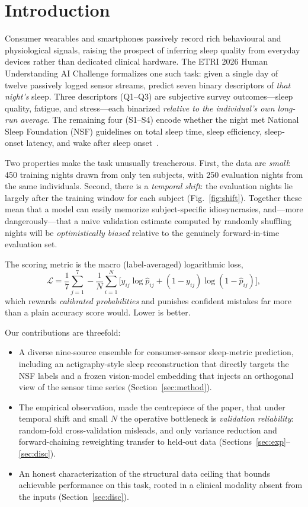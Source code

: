 \documentclass[conference]{IEEEtran}
\begin{document}
\section{Introduction}
Consumer wearables and smartphones passively record rich behavioural and
physiological signals, raising the prospect of inferring sleep quality from everyday
devices rather than dedicated clinical hardware. The ETRI 2026 Human Understanding AI
Challenge formalizes one such task: given a single day of twelve passively logged
sensor streams, predict seven binary descriptors of \emph{that night's} sleep. Three
descriptors (Q1--Q3) are subjective survey outcomes---sleep quality, fatigue, and
stress---each binarized \emph{relative to the individual's own long-run average}. The
remaining four (S1--S4) encode whether the night met National Sleep Foundation (NSF)
guidelines on total sleep time, sleep efficiency, sleep-onset latency, and wake after
sleep onset~\cite{nsf}.

Two properties make the task unusually treacherous. First, the data are
\emph{small}: 450 training nights drawn from only ten subjects, with 250 evaluation
nights from the same individuals. Second, there is a \emph{temporal shift}: the
evaluation nights lie largely after the training window for each subject
(Fig.~\ref{fig:shift}). Together these mean that a model can easily memorize
subject-specific idiosyncrasies, and---more dangerously---that a naive validation
estimate computed by randomly shuffling nights will be \emph{optimistically biased}
relative to the genuinely forward-in-time evaluation set.

The scoring metric is the macro (label-averaged) logarithmic loss,
\begin{equation}
\mathcal{L} = \frac{1}{7}\sum_{j=1}^{7}
-\frac{1}{N}\sum_{i=1}^{N}\Big[y_{ij}\log \hat p_{ij}+(1-y_{ij})\log(1-\hat p_{ij})\Big],
\label{eq:logloss}
\end{equation}
which rewards \emph{calibrated probabilities} and punishes confident mistakes far
more than a plain accuracy score would. Lower is better.

Our contributions are threefold:
\begin{itemize}
\item A diverse nine-source ensemble for consumer-sensor sleep-metric prediction,
including an actigraphy-style sleep reconstruction that directly targets the
NSF labels and a frozen vision-model embedding that injects an orthogonal view of
the sensor time series (Section~\ref{sec:method}).
\item The empirical observation, made the centrepiece of the paper, that under
temporal shift and small $N$ the operative bottleneck is \emph{validation
reliability}: random-fold cross-validation misleads, and only variance reduction
and forward-chaining reweighting transfer to held-out data
(Sections~\ref{sec:exp}--\ref{sec:disc}).
\item An honest characterization of the structural data ceiling that bounds achievable
performance on this task, rooted in a clinical modality absent from the inputs
(Section~\ref{sec:disc}).
\end{itemize}
\end{document}
